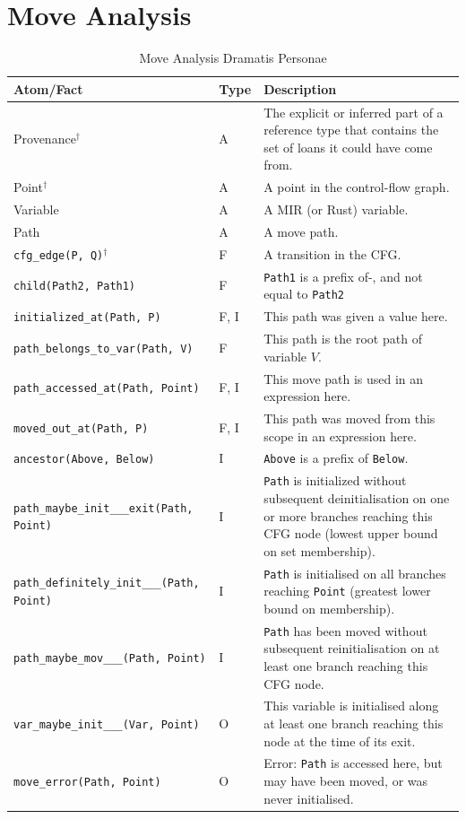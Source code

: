\documentclass[11pt,a4paper,twoside,openany]{report}
\newcommand{\notmine}[0] {$^\dagger$}
\newcommand{\InDatalog}[1]{\texttt{#1}}
\begin{document}
\section{Move Analysis}\label{sec:move-analysis}

{ \renewcommand{\arraystretch}{1.0}
\begin{table}[h]
  \begin{tabular}{@{}l l m{5.5cm}}
    Atom/Fact & Type & Description \\ \hline
    Provenance\notmine & A & The explicit or inferred part of a reference type that contains the set of loans it could have come from.  \\
    Point\notmine & A & A point in the control-flow graph. \\
    Variable & A & A MIR (or Rust) variable. \\
    Path & A & A move path. \\
    \InDatalog{cfg_edge(P, Q)}\notmine & F & A transition in the CFG. \\
    \InDatalog{child(Path2, Path1)} & F & \InDatalog{Path1} is a prefix of-, and not equal to \InDatalog{Path2}  \\
    \InDatalog{initialized_at(Path, P)} & F, I & This path was given a value here. \\
    \InDatalog{path_belongs_to_var(Path, V)} & F & This path is the root path of variable $V$. \\
    \InDatalog{path_accessed_at(Path, Point)} & F, I & This move path is used in an expression here.\\
    \InDatalog{moved_out_at(Path, P)} & F, I & This path was moved from this scope in an expression here. \\
    \InDatalog{ancestor(Above, Below)} & I & \InDatalog{Above} is a prefix of \InDatalog{Below}.\\
    \InDatalog{path_maybe_init___exit(Path, Point)} & I & \InDatalog{Path} is initialized without subsequent deinitialisation on one or more branches reaching this CFG node (lowest upper bound on set membership).\\
    \InDatalog{path_definitely_init___(Path, Point)} & I &  \InDatalog{Path} is initialised on all branches reaching \InDatalog{Point} (greatest lower bound on membership). \\
    \InDatalog{path_maybe_mov___(Path, Point)} & I & \InDatalog{Path} has been moved without subsequent reinitialisation on at least one branch reaching this CFG node. \\
    \InDatalog{var_maybe_init___(Var, Point)} & O & This variable is initialised along at least one branch reaching this node at the time of its exit. \\
    \InDatalog{move_error(Path, Point)} & O & Error: \InDatalog{Path} is accessed here, but may have been moved, or was never initialised. \\
  \end{tabular}
\caption{Move Analysis Dramatis Personae}
  \label{tab:move-facts-recap}
\end{table}%
}
\end{document}
